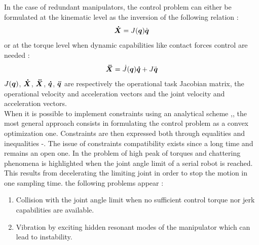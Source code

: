 \documentclass[a4paper, 10pt, conference]{ieeeconf}      %
\newcommand{\vect}[1]{\mbox{\boldmath${#1}$}}%
\begin{document}
In the case of redundant manipulators, the control problem can either be formulated at the kinematic level as the inversion of the following relation : 
\begin{equation}
\vect{\dot{X}} = J(\vect{q}) \dot{\vect{q}}
\label{eq:vel_kin_opt}
\end{equation}
or at the torque level when dynamic capabilities like contact forces control are needed : 
\begin{equation}
\vect{\ddot{X}} = \dot{J}(\vect{q}) \vect{\dot{q}} + J \ddot{\vect{q}}
\label{eq:X_ddot}
\end{equation}
$J(\vect{q})$, $\vect{\dot{X}}$, $\vect{\ddot{X}}$, $\vect{\dot{q}}$, $\vect{\ddot{q}}$ are respectively the operational task Jacobian matrix, the operational velocity and acceleration vectors and the joint velocity and acceleration vectors.
\\
When it is possible to implement constraints using an analytical scheme \cite{ngo2005passivity},\cite{ngo2006bounded}, the most general approach consists in formulating the control problem as a convex optimization one. Constraints are then expressed both through equalities and inequalities \cite{chen1994torque}-\cite{ma2002time}. The issue of constraints compatibility exists since a long time and remains an open one. In \cite{park1998enhanced} the problem of high peak of torques and chattering phenomena is highlighted when the joint angle limit of a serial robot is reached. This results from decelerating the limiting joint in order to stop the motion in one sampling time. the following problems appear :
\begin{enumerate}
\item Collision with the joint angle limit when no sufficient control torque nor jerk capabilities are available.
\item Vibration by exciting hidden resonant modes of the manipulator which can lead to instability.
\end{enumerate}
\end{document}
